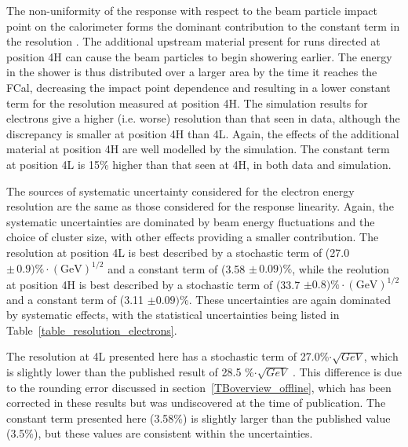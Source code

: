 


The non-uniformity of the response with respect to the beam particle impact point on the calorimeter forms the dominant contribution to the constant term in the resolution \cite{TB98_electron_signals}. The additional upstream material present for runs directed at position 4H can cause the beam particles to begin showering earlier. The energy in the shower is thus distributed over a larger area by the time it reaches the FCal, decreasing the impact point dependence and resulting in a lower constant term for the resolution measured at position 4H. The simulation results for electrons give a higher (i.e. worse) resolution than that seen in data, although the discrepancy is smaller at position 4H than 4L. Again, the effects of the additional material at position 4H are well modelled by the simulation. The constant term at position 4L is 15\% higher than that seen at 4H, in both data and simulation.

The sources of systematic uncertainty considered for the electron energy resolution are the same as those  considered for the response linearity. Again, the systematic uncertainties are dominated by beam energy fluctuations and the choice of cluster size, with other effects providing a smaller contribution. The resolution at position 4L is best described by a stochastic term of (27.0 $\pm \, 0.9) \% \cdot (\mathrm{GeV})^{1/2}$ and a constant term of (3.58 $\pm \, 0.09) \%$, while the reolution at position 4H is best described by a stochastic term of (33.7 $\pm 0.8) \% \cdot (\mathrm{GeV})^{1/2}$ and a constant term of (3.11 $\pm 0.09) \%$. These uncertainties are again dominated by systematic effects, with the statistical uncertainties being listed in Table~\ref{table_resolution_electrons}.

The resolution at 4L presented here has a stochastic term of 27.0\%$ \cdot \surd{GeV}$, which is slightly lower than the published result of 28.5 \%$ \cdot \surd{GeV}$ \cite{Fcalpaper}. This difference is due to the rounding error discussed in section~\ref{TBoverview_offline}, which has been corrected in these results but was undiscovered at the time of publication. The constant term presented here (3.58\%) is slightly larger than the published value (3.5\%), but these values are consistent within the uncertainties. 






